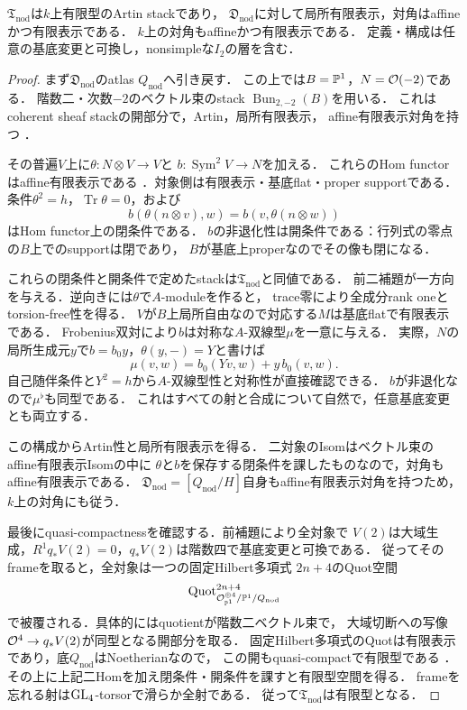 \begin{theorem}[節点曲線上の二次自己双対標的の代数性]
\label{thm:qa-tf-nodal-finite-type-artin}
$\mathfrak T_{\mathrm{nod}}$は$k$上有限型のArtin stackであり，
$\mathfrak D_{\mathrm{nod}}$に対して局所有限表示，対角はaffineかつ有限表示である．
$k$上の対角もaffineかつ有限表示である．
定義・構成は任意の基底変更と可換し，nonsimpleな$I_2$の層を含む．
\end{theorem}
\begin{proof}
まず$\mathfrak D_{\mathrm{nod}}$のatlas $Q_{\mathrm{nod}}$へ引き戻す．
この上では$B=\mathbb P^1$，$N=\mathcal O(-2)$である．
階数二・次数$-2$のベクトル束のstack $\operatorname{Bun}_{2,-2}(B)$を用いる．
これはcoherent sheaf stackの開部分で，Artin，局所有限表示，
affine有限表示対角を持つ
\cite[Theorem~99.6.1, Tag~09DS; Lemmas~108.4.1--108.4.2]{StacksCoherentSheaves}．

その普遍$V$上に$\theta:N\otimes V\to V$と
$b:\operatorname{Sym}^2V\to N$を加える．
これらのHom functorはaffine有限表示である
\cite[Proposition~99.3.10, Tag~08K6]{StacksCoherentSheaves}．対象側は有限表示・基底flat・proper supportである．
条件$\theta^2=h$，$\operatorname{Tr}\theta=0$，および
\[
 b(\theta(n\otimes v),w)=b(v,\theta(n\otimes w))
\]
はHom functor上の閉条件である．
$b$の非退化性は開条件である：行列式の零点の$B$上でのsupportは閉であり，
$B$が基底上properなのでその像も閉になる．

これらの閉条件と開条件で定めたstackは$\mathfrak T_{\mathrm{nod}}$と同値である．
前二補題が一方向を与える．逆向きには$\theta$で$A$-moduleを作ると，
trace零により全成分rank oneとtorsion-free性を得る．
$V$が$B$上局所自由なので対応する$M$は基底flatで有限表示である．
Frobenius双対により$b$は対称な$A$-双線型$\mu$を一意に与える．
実際，$N$の局所生成元$y$で$b=b_0y$，$\theta(y,-)=Y$と書けば
\[
 \mu(v,w)=b_0(Yv,w)+y\,b_0(v,w).
\]
自己随伴条件と$Y^2=h$から$A$-双線型性と対称性が直接確認できる．
$b$が非退化なので$\mu^\flat$も同型である．
これはすべての射と合成について自然で，任意基底変更とも両立する．

この構成からArtin性と局所有限表示を得る．
二対象のIsomはベクトル束のaffine有限表示Isomの中に
$\theta$と$b$を保存する閉条件を課したものなので，対角もaffine有限表示である．
$\mathfrak D_{\mathrm{nod}}=[Q_{\mathrm{nod}}/H]$自身もaffine有限表示対角を持つため，
$k$上の対角にも従う．

最後にquasi-compactnessを確認する．前補題により全対象で
$V(2)$は大域生成，$R^1q_*V(2)=0$，$q_*V(2)$は階数四で基底変更と可換である．
従ってそのframeを取ると，全対象は一つの固定Hilbert多項式
$2n+4$のQuot空間
\[
 \operatorname{Quot}^{2n+4}_{\mathcal O_{\mathbb P^1}^{\oplus4}/\mathbb P^1/Q_{\mathrm{nod}}}
\]
で被覆される．具体的にはquotientが階数二ベクトル束で，
大域切断への写像$\mathcal O^4\to q_*V(2)$が同型となる開部分を取る．
固定Hilbert多項式のQuotは有限表示であり，底$Q_{\mathrm{nod}}$はNoetherianなので，
この開もquasi-compactで有限型である
\cite[Lemma~108.6.1, Tag~0DP9]{StacksCoherentSheaves}．
その上に上記二Homを加え閉条件・開条件を課すと有限型空間を得る．
frameを忘れる射は$\operatorname{GL}_4$-torsorで滑らか全射である．
従って$\mathfrak T_{\mathrm{nod}}$は有限型となる．
\end{proof}

